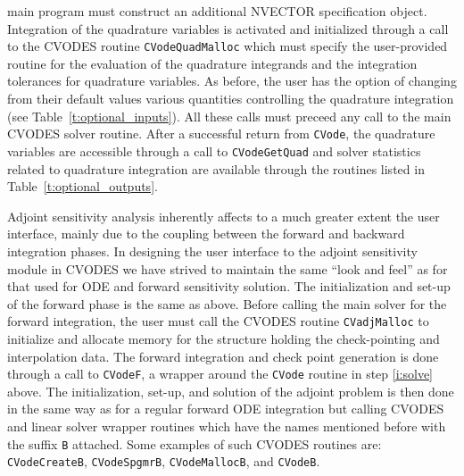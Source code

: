 main program must construct an additional NVECTOR specification object. 
Integration of the quadrature variables is activated and initialized through a 
call to the CVODES routine {\tt CVodeQuadMalloc} which must specify the
user-provided routine for the evaluation of the quadrature integrands and
the integration tolerances for quadrature variables. As before, the user
has the option of changing from their default values various quantities
controlling the quadrature integration (see Table~\ref{t:optional_inputs}).
All these calls must preceed any call to the main CVODES solver routine.
After a successful return from {\tt CVode}, the quadrature variables are
accessible through a call to {\tt CVodeGetQuad} and solver statistics related
to quadrature integration are available through the routines listed in
Table~\ref{t:optional_outputs}.

%
Adjoint sensitivity analysis inherently affects to a much greater extent the 
user interface, mainly due to the coupling between the forward and backward 
integration phases. 
%
In designing the user interface to the adjoint sensitivity module in CVODES we 
have strived to maintain the same ``look and feel'' as for that used for
ODE and forward sensitivity solution.
The initialization and set-up of the forward phase is the same as above.
Before calling the main solver for the forward integration, the user must 
call the CVODES routine {\tt CVadjMalloc} to initialize and allocate memory 
for the structure holding the check-pointing and interpolation data.
The forward integration and check point generation is done through a call
to {\tt CVodeF}, a wrapper around the {\tt CVode} routine in step 
\ref{i:solve} above.
%
The initialization, set-up, and solution of the adjoint problem is then
done in the same way as for a regular forward ODE integration but
calling CVODES and linear solver wrapper routines which have the names 
mentioned before with the suffix {\tt B} attached. Some examples of such
CVODES routines are: {\tt CVodeCreateB}, {\tt CVodeSpgmrB}, {\tt CVodeMallocB},
and {\tt CVodeB}.

